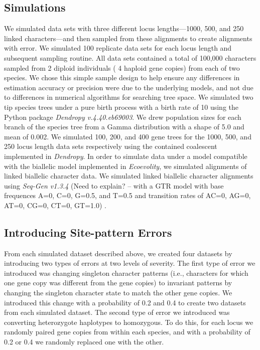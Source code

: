 \subsection{Simulations}
We simulated data sets with three different locus lengths—1000, 500, and 250 linked characters—and then sampled from these alignments to create alignments with  error. We simulated 100 replicate data sets for each locus length and subsequent sampling routine. All data sets contained a total of 100,000 characters sampled from 2 diploid individuals ( 4 haploid gene copies) from each of two species. We chose this simple sample design to help ensure any differences in estimation accuracy or precision were due to the underlying models, and not due to differences in numerical algorithms for searching tree space.  We simulated two tip species trees under a pure birth process with a birth rate of 10 using the Python package \textit{Dendropy v.4.40.eb69003}.  We drew population sizes for each branch of the species tree from a Gamma distribution with a shape of 5.0 and mean of 0.002. We simulated 100, 200, and 400 gene trees for the 1000, 500, and 250 locus length data sets respectively using the contained coalescent implemented in \textit{Dendropy}. In order to simulate data under a model compatible with the biallelic model implemented in \textit{Ecoevolity}, we simulated alignments of linked biallelic character data. We simulated linked biallelic character alignments using \textit{Seq-Gen v1.3.4} (Need to explain? – with a GTR model with base frequences {A=0, C=0, G=0.5, and T=0.5} and  transition rates of {AC=0, AG=0, AT=0, CG=0, CT=0, GT=1.0}) . 

\subsection{Introducing Site-pattern Errors}
From each simulated dataset described above, we created four datasets by introducing two types of errors at two levels of severity. The first type of error we introduced was changing singleton character patterns (i.e., characters for which one gene copy was different from the gene copies) to invariant patterns by changing the singleton character state to match the other gene copies. We introduced this change with a probability of 0.2 and 0.4 to create two datasets from each simulated dataset. The second type of error we introduced was converting heterozygote haplotypes to homozygous. To do this, for each locus we randomly paired gene copies from within each species, and with a probability of 0.2 or 0.4 we randomly replaced one with the other. 

